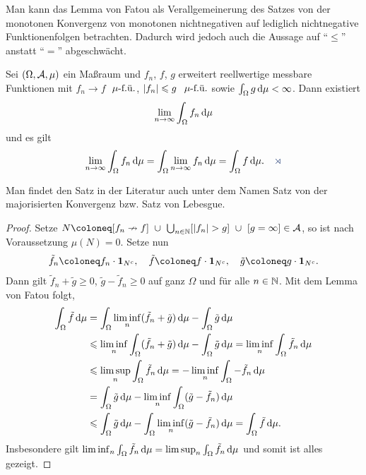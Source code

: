 Man kann das Lemma von Fatou als Verallgemeinerung des Satzes von der monotonen
Konvergenz von monotonen nichtnegativen auf lediglich nichtnegative
Funktionenfolgen betrachten. Dadurch wird jedoch auch die Aussage auf ``$\le$''
anstatt ``$=$'' abgeschwächt.

\begin{propn}
Sei $(\Omega,\AA,\mu)$ ein Maßraum und $f_n$, $f$, $g$ erweitert reellwertige
messbare Funktionen mit $f_n\to f$ $\mufu$, $\abs{f_n}\le g$ $\mufu$ sowie
$\int_\Omega g\dmu < \infty$. Dann existiert 
\begin{align*}
\lim\limits_{n\to\infty} \int_\Omega f_n \dmu
\end{align*}
und es gilt
\begin{align*}
\lim\limits_{n\to\infty} \int_\Omega f_n \dmu
=  \int_\Omega \lim\limits_{n\to\infty} f_n \dmu
= \int_\Omega f\dmu.\fishhere
\end{align*}
\end{propn}
Man findet den Satz in der Literatur auch unter dem Namen Satz von der
majorisierten Konvergenz bzw. Satz von Lebesgue.
\begin{proof}
Setze $N\defl [f_n\nrightarrow f]\ \cup\ \bigcup_{n\in\N} [\abs{f_n}>g]\ \cup\ 
[g=\infty]\in \AA$, so ist nach Voraussetzung $\mu(N) =0$. Setze nun
\begin{align*}
\tilde{f}_n \defl f_n\cdot\Id_{N^c},\quad \tilde{f} \defl f\cdot\Id_{N^c},\quad
\tilde{g}\defl g\cdot\Id_{N^c}.
\end{align*}
Dann gilt $\tilde{f}_n+\tilde{g}\ge 0$, $\tilde{g}-\tilde{f}_n\ge 0$ auf ganz
$\Omega$ und für alle $n\in\N$. Mit dem Lemma von Fatou folgt,
\begin{align*}
\int_\Omega \tilde{f}\dmu
&=
\int_\Omega \liminf_n (\tilde{f}_n + \tilde{g})\dmu
- \int_\Omega \tilde{g}\dmu\\ 
&\le \liminf_n \int_\Omega (\tilde{f}_n+\tilde{g})\dmu - \int_\Omega \tilde{g}
\dmu = \liminf_n \int_\Omega \tilde{f}_n \dmu \\ &  \le \limsup_n \int_\Omega
\tilde{f}_n\dmu
= -\liminf_n \int_\Omega
-\tilde{f}_n\dmu
 \\ &= \int_\Omega \tilde{g} \dmu - \liminf_n \int_\Omega
(\tilde{g}-\tilde{f}_n)\dmu\\ &\le
\int_\Omega \tilde{g}\dmu - \int_\Omega \liminf_n (\tilde{g}-\tilde{f}_n)\dmu
= \int_\Omega \tilde{f}\dmu.
\end{align*}
Insbesondere gilt $\liminf_n \int_\Omega \tilde{f}_n \dmu  = \limsup_n
\int_\Omega \tilde{f}_n\dmu$ und somit ist alles gezeigt.\qedhere
\end{proof}


